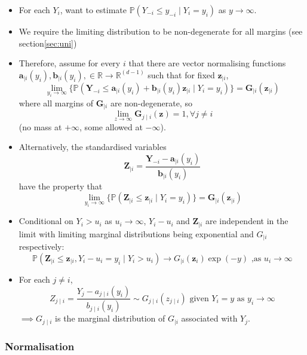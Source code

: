 \documentclass{article}
\begin{document}
\begin{itemize}
  \item For each $Y_i$, want to estimate $\mathbb{P}(Y_{-i} \le y_{-i} \mid Y_i = y_i)$ as $y \rightarrow \infty$. 
  \item We require the limiting distribution to be non-degenerate for all margins (see section\ref{sec:uni})
  \item Therefore, assume for every $i$ that there are vector normalising functions $\bm{a}_{\mid i}(y_i),\bm{b}_{\mid i}(y_i), \in \mathbb{R} \rightarrow \mathbb{R}^{(d-1)}$ such that for fixed $\bm{z}_{\mid i}$, 
    \[
      \lim_{y_i \rightarrow \infty}\{\mathbb{P}(\bm{Y}_{-i} \le \bm{a}_{\mid i}(y_i) + \bm{b}_{\mid i}(y_i)\bm{z}_{\mid i} \mid Y_i = y_i)\} = \bm{G}_{\mid i}(\bm{z}_{\mid i})
    \] 
    where all margins of $\bm{G}_{\mid i}$ are non-degenerate, so 
    \[
    \lim_{z \rightarrow \infty}{\bm{G}_{j \mid i}(\bm{z})} = 1, \forall j \ne i
    \] (no mass at $+\infty$, some allowed at $-\infty$).
  \item Alternatively, the standardised variables
    \[
      \bm{Z}_{\mid i} = \frac{\bm{Y}_{-i} - \bm{a}_{\mid i}(y_i)} {\bm{b}_{\mid i}(y_i)}
    \]
    have the property that 
    \[
      \lim_{y_i \rightarrow \infty}\{\mathbb{P}(\bm{Z}_{\mid i} \le \bm{z}_{\mid i} \mid Y_i = y_i)\} = \bm{G}_{\mid i}(\bm{z}_{\mid i})
    \]
  \item Conditional on $Y_i > u_i$ as $u_i \rightarrow \infty$, $Y_i  - u_i$ and $\bm{Z}_{\mid i}$ are independent in the limit with limiting marginal distributions being exponential and $G_{\mid i}$ respectively:
    \[
      \mathbb{P}(\bm{Z}_{\mid i} \le \bm{z}_{\mid i}, Y_i - u_i = y_i \mid Y_i > u_i) \rightarrow G_{\mid i}(\bm{z}_i) \exp(-y) \text{ ,as } u_i \rightarrow \infty
    \]
  \item For each $j \ne i$, 
    \[
      Z_{j\mid i} = \frac{Y_j - a_{j\mid i}(y_i)}{b_{j\mid i}(y_i)} \sim G_{j\mid i}(z_{j\mid i}) \text { given } Y_i = y \text{ as } y_i \rightarrow \infty
    \]
    $\implies G_{j \mid i}$ is the marginal distribution of $G_{\mid i}$ associated with $Y_j$.
\end{itemize}

\subsubsection{Normalisation} \label{subsubsec:norm}
\end{document}
